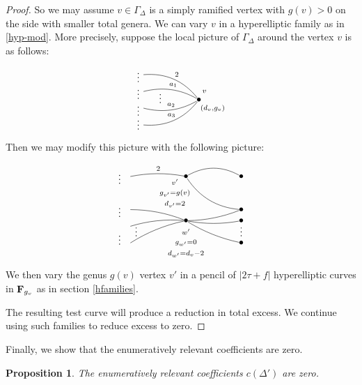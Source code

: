 \documentclass[reqno, 10 pt]{article}
\newtheorem{prop}[thm]{Proposition}
\theoremstyle{definition}
\theoremstyle{remark}
\numberwithin{equation}{section}
\numberwithin{thm}{section}
\numberwithin{prop}{section}
\numberwithin{lem}{section}
\numberwithin{cor}{section}
\numberwithin{conj}{section}
\numberwithin{defn}{section}
\newcommand{\F}{{\mathbf F}}
\renewcommand{\F}{{\bf F}}
\begin{document}
\begin{proof}
    So we may assume $v \in \Gamma_{\Delta}$ is a simply ramified vertex with $g(v) > 0$ on the side with smaller total genera.  We can vary $v$ in a hyperelliptic family as in \eqref{hyp-mod}. More precisely, suppose the local picture of $\Gamma_{\Delta}$ around the vertex $v$ is as follows: 

    \[   \xygraph{
    !{<0cm,0cm>;<1cm,0cm>:<0cm,1cm>::}
    !{(0,.9) }*{}="l_1"
    !{(0,.3) }*{}="l_2"
    !{(0,-.3) }*{}="l_3"
    !{(0,-.9) }*{}="l_4"
    !{(2,0) }*{\bullet}="r"
    !{(.6,.15) }*{\vdots}
    !{(-.2,.9) }*{\vdots}
    !{(-.2,.3) }*{\vdots}
    !{(-.2,-.3) }*{\vdots}
    !{(-.2,-.8) }*{\vdots}
    !{(2.2,.3) }*{\scriptstyle v }
    !{(2.5,-.3) }*{\scriptstyle (d_v, g_v) }
     "l_1"-@/^.3cm/"r"^2 
    "l_2"-@/^/"r"^{a_{1}}
    "l_3"-@/_/"r"^{a_{2}} 
    "l_4"-@/_.3cm/"r"^{a_{3}}
    }  \] 

    Then we may modify this picture with the following picture: 

    \[  \xygraph{
    !{<0cm,0cm>;<2cm,0cm>:<0cm,2cm>::}
    !{(0,.3) }*{}="l_2"
    !{(0,-.3) }*{}="l_3"
    !{(0,-.6) }*{}="l_{3.5}"
    !{(0,-.9) }*{}="l_4"
    !{(2,.3) }*{\bullet}="r+"
    !{(2,-.3) }*{\bullet}="r_2"
    !{(2,-.5) }*{\bullet}="r_3"!{(2,-.65) }*{\vdots}
    !{(2,-.9) }*{\bullet}="r_4"
!{(1,.3) }*{\bullet}="m_2"!{(.8,.2) }*{\scriptstyle v'}!{(.8,0) }*{\scriptstyle g_{v'} = g(v)} !{(.8,-.2) }*{\scriptstyle d_{v'} = 2}
    !{(1,-.5) }*{\bullet}="m"!{(1,-.7) }*{\scriptstyle w'}!{(1,-.9) }*{\scriptstyle g_{w'} = 0}!{(1,-1.1) }*{\scriptstyle d_{w'} = d_{v} - 2}
    !{(-.2,.3) }*{\vdots}
    !{(-.2,-.3) }*{\vdots}
    !{(.1,-.65) }*++++{\vdots}
    !{(-.2,-.8) }*{\vdots}
    "m_2"-@/^.3cm/"r+"
    "m_2"-@/_.3cm/"r_2" 
    "m"-@/_.1cm/"l_4" 
    "m"-@/_.1cm/"l_3" 
    "m"-@/_.1cm/"l_{3.5}"
    "m_2"-@/_.1cm/"l_2"_{2}
    "m"-@/_.1cm/"r_4" 
    "m"-@/_.1cm/"r_3" 
    "m"-@/_.1cm/"r_2" 
    }  \]


    We then vary the genus $g(v)$ vertex $v'$ in a pencil of $|2\tau + f|$ hyperelliptic curves in $\F_{g_{v}}$ as in section \ref{hfamilies}. 

    The resulting test curve will produce a reduction in total excess. We continue using such families to reduce excess to zero.

    \end{proof}



    Finally, we show that the enumeratively relevant coefficients are zero. 

    \begin{prop}\label{lem3}
    The enumeratively relevant coefficients $c(\Delta')$ are zero.
    \end{prop}
\end{document}
